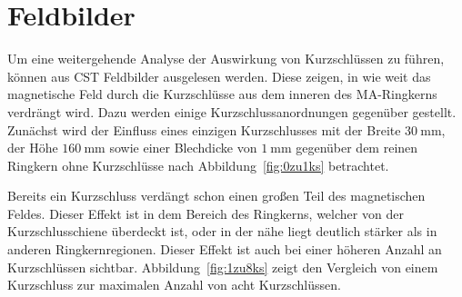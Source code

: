 \section{Feldbilder}
Um eine weitergehende Analyse der Auswirkung von Kurzschl\"ussen zu f\"uhren, k\"onnen aus CST Feldbilder ausgelesen werden. Diese zeigen, in wie weit das magnetische Feld durch die Kurzschl\"usse aus dem inneren des MA-Ringkerns verdr\"angt wird. Dazu werden einige Kurzschlussanordnungen gegen\"uber gestellt. Zun\"achst wird der Einfluss eines einzigen Kurzschlusses mit der Breite $\SI{30}{\milli\meter}$, der H\"ohe $\SI{160}{\milli\meter}$ sowie einer Blechdicke von $\SI{1}{\milli\meter}$ gegen\"uber dem reinen Ringkern ohne Kurzschl\"usse nach Abbildung~\ref{fig:0zu1ks} betrachtet.
\par
Bereits ein Kurzschluss verd\"angt schon einen gro\ss{}en Teil des magnetischen Feldes. Dieser Effekt ist in dem Bereich des Ringkerns, welcher von der Kurzschlusschiene \"uberdeckt ist, oder in der n\"ahe liegt deutlich st\"arker als in anderen Ringkernregionen. Dieser Effekt ist auch bei einer h\"oheren Anzahl an Kurzschl\"ussen sichtbar. Abbildung~\ref{fig:1zu8ks} zeigt den Vergleich von einem Kurzschluss zur maximalen Anzahl von acht Kurzschl\"ussen.
